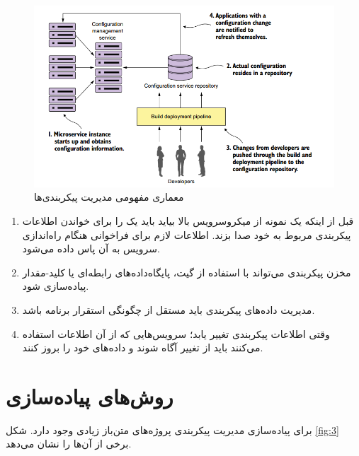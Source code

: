 \documentclass[a4paper,12pt]{book}
\begin{document}
\begin{figure}[h]
	\centering
	\includegraphics[width=\textwidth]{2.png}
	\caption{معماری مفهومی مدیریت پیکربندی‌ها}
	\label{fig:2}
\end{figure}

\begin{enumerate}
	\item
	قبل از اینکه یک نمونه از میکروسرویس بالا بیاید باید یک  را برای خواندن اطلاعات پیکربندی مربوط به خود صدا بزند. اطلاعات لازم برای فراخوانی  هنگام راه‌اندازی سرویس به آن پاس داده می‌شود.
	\item
	مخزن پیکربندی می‌تواند با استفاده از گیت، پایگاه‌داده‌های رابطه‌ای یا کلید-مقدار پیاده‌سازی شود.
	\item
	مدیریت داده‌های پیکربندی باید مستقل از چگونگی استقرار برنامه باشد.
	\item
	وقتی اطلاعات پیکربندی تغییر یابد؛ سرویس‌هایی که از آن اطلاعات استفاده می‌کنند باید از تغییر آگاه شوند و داده‌های خود را بروز کنند.
\end{enumerate}



\section{روش‌های پیاده‌سازی}
برای پیاده‌سازی مدیریت پیکربندی پروژه‌های متن‌باز زیادی وجود دارد. شکل  \ref{fig:3}  برخی از آن‌ها را نشان می‌دهد.
\end{document}
